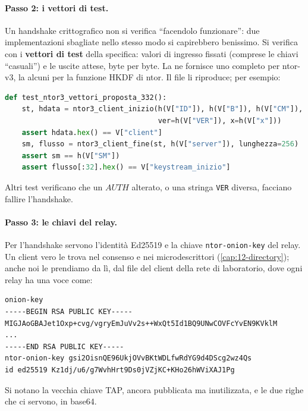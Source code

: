 \paragraph{Passo 2: i vettori di test.} Un handshake crittografico non si verifica \enquote{facendolo funzionare}: due implementazioni sbagliate nello stesso modo si capirebbero benissimo. Si verifica con i \textbf{vettori di test} della specifica: valori di ingresso fissati (comprese le chiavi \enquote{casuali}) e le uscite attese, byte per byte. La  ne fornisce uno completo per ntor-v3, la  alcuni per la funzione HKDF di ntor. Il file  li riproduce; per esempio:
\begin{lstlisting}[language=Python]
def test_ntor3_vettori_proposta_332():
    st, hdata = ntor3_client_inizio(h(V["ID"]), h(V["B"]), h(V["CM"]),
                                    ver=h(V["VER"]), x=h(V["x"]))
    assert hdata.hex() == V["client"]
    sm, flusso = ntor3_client_fine(st, h(V["server"]), lunghezza=256)
    assert sm == h(V["SM"])
    assert flusso[:32].hex() == V["keystream_inizio"]
\end{lstlisting}
Altri test verificano che un $\mathit{AUTH}$ alterato, o una stringa \texttt{VER} diversa, facciano fallire l'handshake.

\paragraph{Passo 3: le chiavi del relay.} Per l'handshake servono l'identità Ed25519 e la chiave \texttt{ntor-onion-key} del relay. Un client vero le trova nel consenso e nei microdescrittori (\cref{cap:12-directory}); anche noi le prendiamo da lì, dal file  del client della rete di laboratorio, dove ogni relay ha una voce come:
\begin{lstlisting}[numbers=none]
onion-key
-----BEGIN RSA PUBLIC KEY-----
MIGJAoGBAJet1Oxp+cvg/vgryEmJuVv2s++WxQt5Id1BQ9UNwCOVFcYvEN9KVklM
...
-----END RSA PUBLIC KEY-----
ntor-onion-key gsi2OisnQE96UkjOVvBKtWDLfwRdYG9d4DScg2wz4Qs
id ed25519 Kz1dj/u6/g7WvhHrt9Ds0jVZjKC+KHo26hWViXAJ1Pg
\end{lstlisting}
Si notano la vecchia chiave TAP, ancora pubblicata ma inutilizzata, e le due righe che ci servono, in base64.

